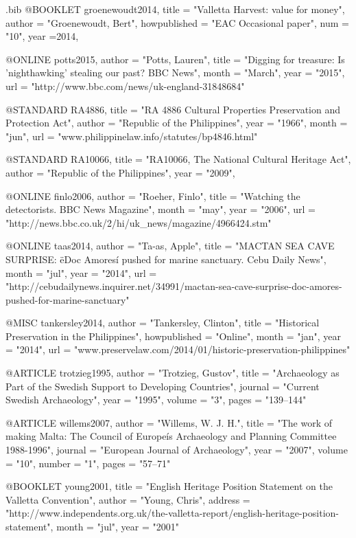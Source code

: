 \begin{filecontents}{\IJSRAidentifier.bib}
@BOOKLET {groenewoudt2014,
    title        = "Valletta Harvest: value for money",
    author       = "Groenewoudt, Bert",
    howpublished = "EAC Occasional paper",
    num          = "10",
    year ={2014},
}

@ONLINE {potts2015,
author = "Potts, Lauren",
title  = "Digging for treasure: Is 'nighthawking' stealing our past? BBC News",
month  = "March",
year   = "2015",
url    = "http://www.bbc.com/news/uk-england-31848684"
}

@STANDARD {RA4886,
title  = "RA 4886 Cultural Properties Preservation and Protection Act",
author = "Republic of the Philippines",
year   = "1966",
month  = "jun",
url   = "www.philippinelaw.info/statutes/bp4846.html"
}

@STANDARD {RA10066,
title  = "RA10066, The National Cultural Heritage Act",
author = "Republic of the Philippines",
year   = "2009",
}

@ONLINE {finlo2006,
author = "Roeher, Finlo",
title  = "Watching the detectorists. BBC News Magazine",
month  = "may",
year   = "2006",
url    = "http://news.bbc.co.uk/2/hi/uk_news/magazine/4966424.stm"
}

@ONLINE {taas2014,
author = "Ta-as, Apple",
title  = "MACTAN SEA CAVE SURPRISE: ëDoc Amoresí pushed for marine sanctuary. Cebu Daily News",
month  = "jul",
year   = "2014",
url    = "http://cebudailynews.inquirer.net/34991/mactan-sea-cave-surprise-doc-amores-pushed-for-marine-sanctuary"
}

@MISC {tankersley2014,
author       = "Tankersley, Clinton",
title        = "Historical Preservation in the Philippines",
howpublished = "Online",
month        = "jan",
year         = "2014",
url         = "www.preservelaw.com/2014/01/historic-preservation-philippines"
}

@ARTICLE {trotzieg1995,
author  = "Trotzieg, Gustov",
title   = "Archaeology as Part of the Swedish Support to Developing Countries",
journal = "Current Swedish Archaeology",
year    = "1995",
volume  = "3",
pages   = "139--144"
}

@ARTICLE {willems2007,
author  = "Willems, W. J. H.",
title   = "The work of making Malta: The Council of Europeís Archaeology and Planning Committee 1988-1996",
journal = "European Journal of Archaeology",
year    = "2007",
volume  = "10",
number  = "1",
pages   = "57--71"
}

@BOOKLET {young2001,
title   = "English Heritage Position Statement on the Valletta Convention",
author  = "Young, Chris",
address = "http://www.independents.org.uk/the-valletta-report/english-heritage-position-statement",
month   = "jul",
year    = "2001"
}

\end{filecontents}

